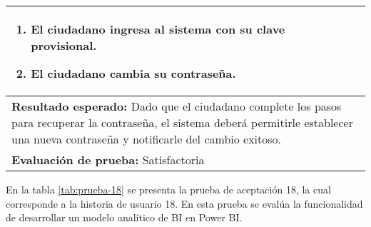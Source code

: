 \begin{longtable}{|p{6.7cm}|p{6.7cm}|}
{\begin{enumerate}
        \item El ciudadano ingresa al sistema con su clave provisional.
        \item El ciudadano cambia su contraseña.
    \end{enumerate}}                                                                                                                                \\
    \hline
    \multicolumn{2}{|p{13.4cm}|}{\textbf{Resultado esperado:} Dado que el ciudadano complete los pasos para recuperar la contraseña, el sistema deberá permitirle establecer una nueva contraseña y notificarle del cambio exitoso.} \\
    \hline
    \multicolumn{2}{|p{13.4cm}|}{\textbf{Evaluación de prueba:} Satisfactoria}                                                                                                                                                       \\
    \hline
\end{longtable}

En la tabla \ref{tab:prueba-18} se presenta la prueba de aceptación 18, la cual corresponde a la historia de usuario 18.
En esta prueba se evalúa la funcionalidad de desarrollar un modelo analítico de BI en Power BI.

